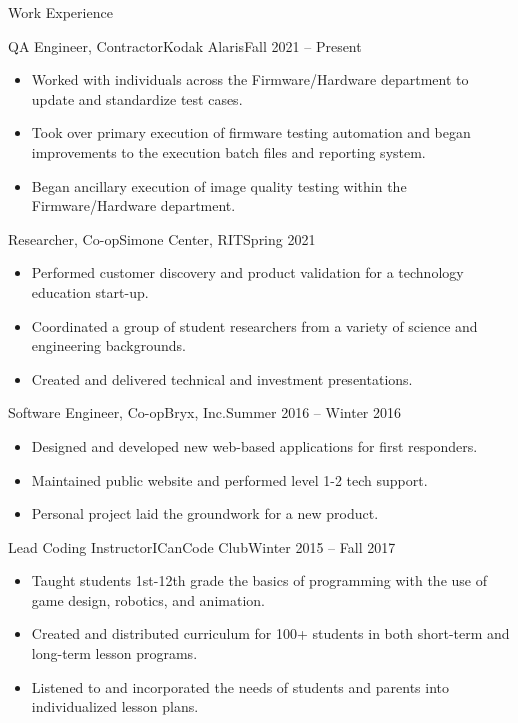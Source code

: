 \documentclass[]{mcdowellcv}
\begin{document}
	\makeheader
	
	\begin{cvsection}{Work Experience}
		\begin{cvsubsection}{QA Engineer, Contractor}{Kodak Alaris}{Fall 2021 -- Present}
				
			\begin{itemize}
				\item Worked with individuals across the Firmware/Hardware department to update and standardize test cases.
				\item Took over primary execution of firmware testing automation and began improvements to the execution batch files and reporting system.
				\item Began ancillary execution of image quality testing within the Firmware/Hardware department.
			\end{itemize}
		\end{cvsubsection}
			
		\begin{cvsubsection}{Researcher, Co-op}{Simone Center, RIT}{Spring 2021}
				
			\begin{itemize}
				\item Performed customer discovery and product validation for a technology education start-up.
				\item Coordinated a group of student researchers from a variety of science and engineering backgrounds.
				\item Created and delivered technical and investment presentations.
			\end{itemize}
		\end{cvsubsection}
		
		\begin{cvsubsection}{Software Engineer, Co-op}{Bryx, Inc.}{Summer 2016 -- Winter 2016}	
			\begin{itemize}
				\item Designed and developed new web-based applications for first responders.
				\item Maintained public website and performed level 1-2 tech support.
				\item Personal project laid the groundwork for a new product.
			\end{itemize}
		\end{cvsubsection}
		
		\begin{cvsubsection}{Lead Coding Instructor}{ICanCode Club}{Winter 2015 -- Fall 2017}		
			\begin{itemize}
				\item Taught students 1st-12th grade the basics of programming with the use of game design, robotics, and animation.
				\item Created and distributed curriculum for 100+ students in both short-term and long-term lesson programs.
				\item Listened to and incorporated the needs of students and parents into individualized lesson plans.
			\end{itemize}
		\end{cvsubsection}	
	\end{cvsection}
	
\end{document}
